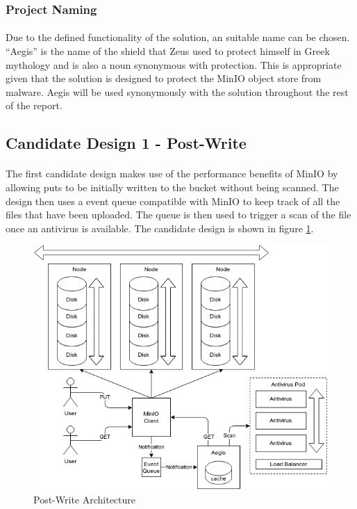 \documentclass[12pt, conference, final, a4paper, onecolumn, compsoc]{IEEEtran}
\begin{document}
\subsubsection*{Project Naming}
\paragraph{}
Due to the defined functionality of the solution, an suitable name can be
chosen. ``Aegis'' is the name of the shield that Zeus used to protect himself in
Greek mythology and is also a noun synonymous with protection. This is
appropriate given that the solution is designed to protect the MinIO object
store from malware. Aegis will be used synonymously with the solution throughout
the rest of the report.

\subsection*{Candidate Design 1 - Post-Write}
\paragraph{}

The first candidate design makes use of the performance benefits of MinIO by
allowing puts to be initially written to the bucket without being scanned. The
design then uses a event queue compatible with MinIO to keep track of all the
files that have been uploaded. The queue is then used to trigger a scan of the
file once an antivirus is available. The candidate design is shown in figure
\ref{fig:postWriteArch}.

\begin{figure}
  \includegraphics[scale=.4]{diagrams/post-write.png}
  \caption{Post-Write Architecture}
  \label{fig:postWriteArch}
\end{figure}
\end{document}

